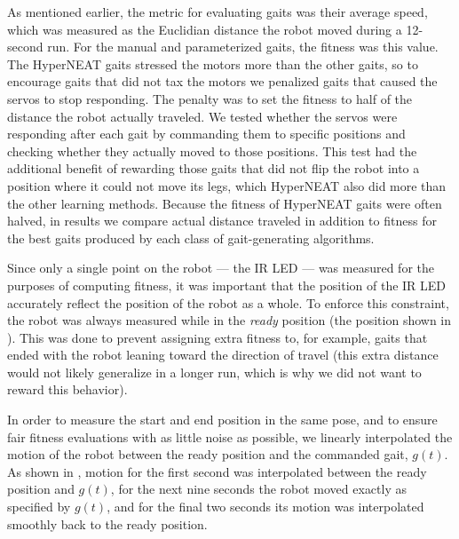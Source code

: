 As mentioned earlier, the metric for evaluating gaits was their
average speed, which was measured as the Euclidian distance the robot
moved during a 12-second run. For the manual and parameterized gaits, the fitness was this value. The HyperNEAT gaits stressed the motors more than the other gaits, so to encourage gaits that did not tax the motors we penalized gaits that caused the servos to stop responding. The penalty was to set the fitness to half of the distance the robot actually traveled. We tested whether the servos were responding after each gait by commanding them to specific positions and checking whether they actually moved to those positions. This test had the additional benefit of rewarding those gaits that did not flip the robot into a position where it could not move its legs, which HyperNEAT also did more than the other learning methods. Because the fitness of HyperNEAT gaits were often halved, in results we compare actual distance traveled in addition to fitness for the best gaits produced by each class of gait-generating algorithms. 

Since only a single point on the robot --- the IR LED --- was measured
for the purposes of computing fitness, it was important that the
position of the IR LED accurately reflect the position of the robot as
a whole.  To enforce this constraint, the robot was always measured
while in the \emph{ready} position (the position shown in
).  This was done to prevent assigning extra
fitness to, for example, gaits that ended with the robot leaning toward
the direction of travel (this extra distance would not likely generalize
in a longer run, which is why we did not want to reward this behavior).

In order to measure the start and end position in the same pose, and to ensure fair fitness evaluations with as little noise as possible, we
linearly interpolated the motion of the robot between the ready
position and the commanded gait, $g(t)$.  As shown in
, motion for the first second was interpolated
between the ready position and $g(t)$, for the next nine seconds the
robot moved exactly as specified by $g(t)$, and for the final two
seconds its motion was interpolated smoothly back to the ready
position.



